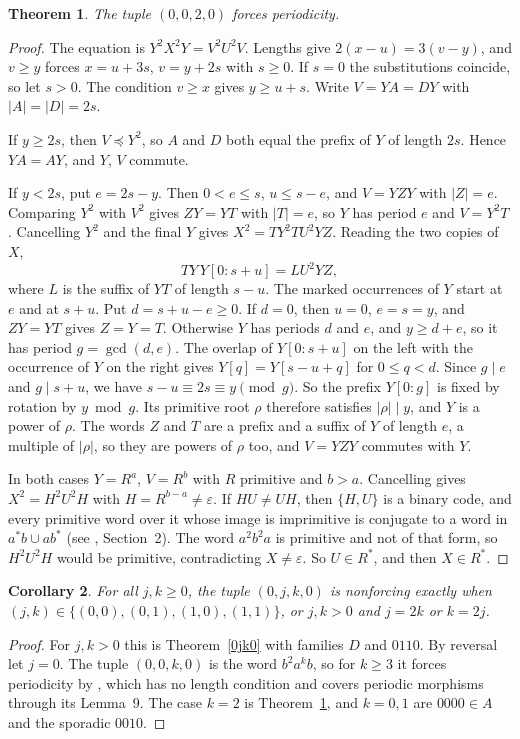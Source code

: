\documentclass[11pt]{article}
\newtheorem{theorem}{Theorem}
\newtheorem{corollary}[theorem]{Corollary}
\newcommand{\eps}{\varepsilon}
\theoremstyle{remark}\newtheorem*{remark}{Remark}
\begin{document}
\begin{theorem}\label{0020}
The tuple \((0,0,2,0)\) forces periodicity.
\end{theorem}
\begin{proof}
The equation is \(Y^2X^2Y=V^2U^2V\). Lengths give \(2(x-u)=3(v-y)\), and \(v\ge y\) forces \(x=u+3s\), \(v=y+2s\) with \(s\ge0\). If \(s=0\) the substitutions coincide, so let \(s>0\). The condition \(v\ge x\) gives \(y\ge u+s\). Write \(V=YA=DY\) with \(|A|=|D|=2s\).

If \(y\ge2s\), then \(V\preceq Y^2\), so \(A\) and \(D\) both equal the prefix of \(Y\) of length \(2s\). Hence \(YA=AY\), and \(Y\), \(V\) commute.

If \(y<2s\), put \(e=2s-y\). Then \(0<e\le s\), \(u\le s-e\), and \(V=YZY\) with \(|Z|=e\). Comparing \(Y^2\) with \(V^2\) gives \(ZY=YT\) with \(|T|=e\), so \(Y\) has period \(e\) and \(V=Y^2T\). Cancelling \(Y^2\) and the final \(Y\) gives \(X^2=TY^2TU^2YZ\). Reading the two copies of \(X\),
\[TY\,Y[0:s+u]=LU^2YZ,\]
where \(L\) is the suffix of \(YT\) of length \(s-u\). The marked occurrences of \(Y\) start at \(e\) and at \(s+u\). Put \(d=s+u-e\ge0\). If \(d=0\), then \(u=0\), \(e=s=y\), and \(ZY=YT\) gives \(Z=Y=T\). Otherwise \(Y\) has periods \(d\) and \(e\), and \(y\ge d+e\), so it has period \(g=\gcd(d,e)\). The overlap of \(Y[0:s+u]\) on the left with the occurrence of \(Y\) on the right gives \(Y[q]=Y[s-u+q]\) for \(0\le q<d\). Since \(g\mid e\) and \(g\mid s+u\), we have \(s-u\equiv 2s\equiv y\pmod g\). So the prefix \(Y[0:g]\) is fixed by rotation by \(y\bmod g\). Its primitive root \(\rho\) therefore satisfies \(|\rho|\mid y\), and \(Y\) is a power of \(\rho\). The words \(Z\) and \(T\) are a prefix and a suffix of \(Y\) of length \(e\), a multiple of \(|\rho|\), so they are powers of \(\rho\) too, and \(V=YZY\) commutes with \(Y\).

In both cases \(Y=R^a\), \(V=R^b\) with \(R\) primitive and \(b>a\). Cancelling gives \(X^2=H^2U^2H\) with \(H=R^{b-a}\ne\eps\). If \(HU\ne UH\), then \(\{H,U\}\) is a binary code, and every primitive word over it whose image is imprimitive is conjugate to a word in \(a^*b\cup ab^*\) (see \cite{hh}, Section~2). The word \(a^2b^2a\) is primitive and not of that form, so \(H^2U^2H\) would be primitive, contradicting \(X\ne\eps\). So \(U\in R^*\), and then \(X\in R^*\).
\end{proof}

\begin{corollary}\label{0jk0full}
For all \(j,k\ge0\), the tuple \((0,j,k,0)\) is nonforcing exactly when \((j,k)\in\{(0,0),(0,1),(1,0),(1,1)\}\), or \(j,k>0\) and \(j=2k\) or \(k=2j\).
\end{corollary}
\begin{proof}
For \(j,k>0\) this is Theorem~\ref{0jk0} with families \(D\) and \(0110\). By reversal let \(j=0\). The tuple \((0,0,k,0)\) is the word \(b^2a^kb\), so for \(k\ge3\) it forces periodicity by \cite[Theorem~1]{hh}, which has no length condition and covers periodic morphisms through its Lemma~9. The case \(k=2\) is Theorem~\ref{0020}, and \(k=0,1\) are \(0000\in A\) and the sporadic \(0010\).
\end{proof}
\end{document}

